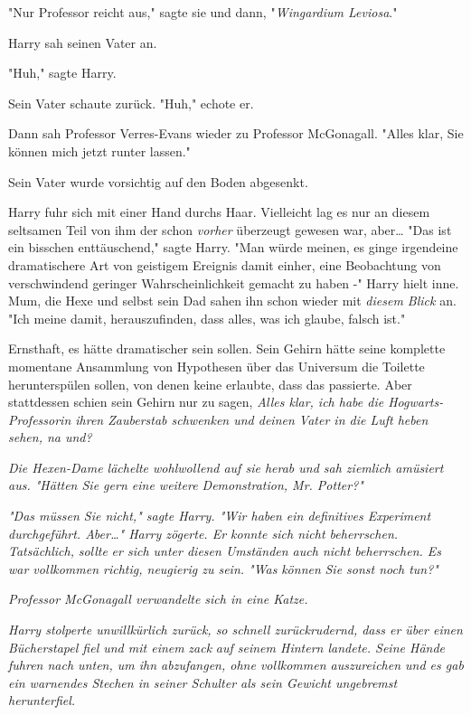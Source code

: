 {"Nur Professor reicht aus," sagte sie und dann, "\emph{Wingardium Leviosa}."

Harry sah seinen Vater an.

"Huh," sagte Harry.

Sein Vater schaute zurück. "Huh," echote er.

Dann sah Professor Verres-Evans wieder zu Professor McGonagall. "Alles klar, Sie können mich jetzt runter lassen."

Sein Vater wurde vorsichtig auf den Boden abgesenkt.

Harry fuhr sich mit einer Hand durchs Haar. Vielleicht lag es nur an diesem seltsamen Teil von ihm der schon \emph{vorher} überzeugt gewesen war, aber… "Das ist ein bisschen enttäuschend," sagte Harry. "Man würde meinen, es ginge irgendeine dramatischere Art von geistigem Ereignis damit einher, eine Beobachtung von verschwindend geringer Wahrscheinlichkeit gemacht zu haben -" Harry hielt inne. Mum, die Hexe und selbst sein Dad sahen ihn schon wieder mit \emph{diesem Blick} an. "Ich meine damit, herauszufinden, dass alles, was ich glaube, falsch ist."

Ernsthaft, es hätte dramatischer sein sollen. Sein Gehirn hätte seine komplette momentane Ansammlung von Hypothesen über das Universum die Toilette herunterspülen sollen, von denen keine erlaubte, dass das passierte. Aber stattdessen schien sein Gehirn nur zu sagen, \emph{Alles klar, ich habe die Hogwarts-Professorin ihren Zauberstab schwenken und deinen Vater in die Luft heben sehen, na und?}

\emph{Die Hexen-Dame lächelte wohlwollend auf sie herab und sah ziemlich amüsiert aus. "Hätten Sie gern eine weitere Demonstration, Mr. Potter?"}

\emph{"Das müssen Sie nicht," sagte Harry. "Wir haben ein definitives Experiment durchgeführt. Aber…" Harry zögerte. Er konnte sich nicht beherrschen. Tatsächlich,} \emph{\emph{sollte}} \emph{er sich unter diesen Umständen auch nicht beherrschen. Es war vollkommen richtig, neugierig zu sein. "Was} \emph{\emph{können}} \emph{Sie sonst noch tun?"}

\emph{Professor McGonagall verwandelte sich in eine Katze.}

\emph{Harry stolperte unwillkürlich zurück, so schnell zurückrudernd, dass er über einen Bücherstapel fiel und mit einem} \emph{\emph{zack}} \emph{auf seinem Hintern landete. Seine Hände fuhren nach unten, um ihn abzufangen, ohne vollkommen auszureichen und es gab ein warnendes Stechen in seiner Schulter als sein Gewicht ungebremst herunterfiel.}

}
